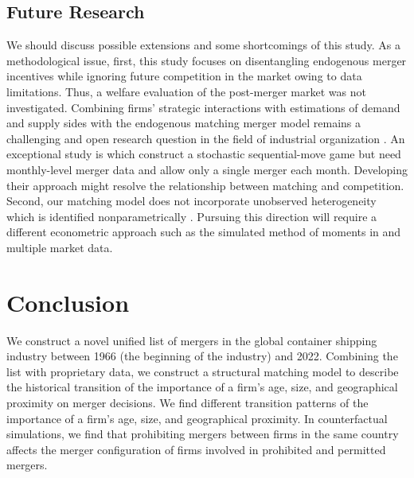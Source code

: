 \documentclass[10pt]{article}
\begin{document}
\subsection{Future Research}

We should discuss possible extensions and some shortcomings of this study. 
As a methodological issue, first, this study focuses on disentangling endogenous merger incentives while ignoring future competition in the market owing to data limitations. 
Thus, a welfare evaluation of the post-merger market was not investigated.
Combining firms' strategic interactions with estimations of demand and supply sides with the endogenous matching merger model remains a challenging and open research question in the field of industrial organization \citep{agarwal2021market}. 
An exceptional study is \cite{igami2019mergers} which construct a stochastic sequential-move game but need monthly-level merger data and allow only a single merger each month. 
Developing their approach might resolve the relationship between matching and competition.
Second, our matching model does not incorporate unobserved heterogeneity which is identified nonparametrically \citep{fox2018jpe}.
Pursuing this direction will require a different econometric approach such as the simulated method of moments in \cite{fox2018jpe} and multiple market data. 





\section{Conclusion}\label{sec:conclusion}
We construct a novel unified list of mergers in the global container shipping industry between 1966 (the beginning of the industry) and 2022. 
Combining the list with proprietary data, we construct a structural matching model to describe the historical transition of the importance of a firm's age, size, and geographical proximity on merger decisions. 
We find different transition patterns of the importance of a firm's age, size, and geographical proximity.
In counterfactual simulations, we find that prohibiting mergers between firms in the same country affects the merger configuration of firms involved in prohibited and permitted mergers.

\newpage

\end{document}
